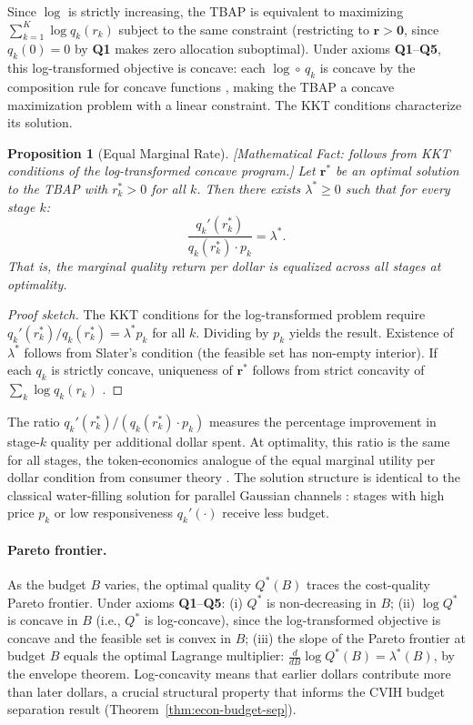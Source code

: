 \documentclass[11pt, a4paper]{googledeepmind}
\newtheorem{proposition}{Proposition}[section]
\begin{document}
Since $\log$ is strictly increasing, the TBAP is equivalent to maximizing $\sum_{k=1}^K \log q_k(r_k)$ subject to the same constraint (restricting to $\mathbf{r} > \mathbf{0}$, since $q_k(0) = 0$ by \textbf{Q1} makes zero allocation suboptimal). Under axioms \textbf{Q1}--\textbf{Q5}, this log-transformed objective is concave: each $\log \circ\, q_k$ is concave by the composition rule for concave functions \citep{boyd2004}, making the TBAP a concave maximization problem with a linear constraint. The KKT conditions characterize its solution.

\begin{proposition}[Equal Marginal Rate]
\label{thm:econ-emr}
\emph{[Mathematical Fact: follows from KKT conditions of the log-transformed concave program.]}
Let $\mathbf{r}^*$ be an optimal solution to the TBAP with $r_k^* > 0$ for all $k$. Then there exists $\lambda^* \geq 0$ such that for every stage $k$:
\begin{equation}\label{eq:econ-emr}
    \frac{q_k'(r_k^*)}{q_k(r_k^*) \cdot p_k} = \lambda^*.
\end{equation}
That is, the \emph{marginal quality return per dollar} is equalized across all stages at optimality.
\end{proposition}

\begin{proof}[Proof sketch]
The KKT conditions for the log-transformed problem require $q_k'(r_k^*) / q_k(r_k^*) = \lambda^* p_k$ for all $k$. Dividing by $p_k$ yields the result. Existence of $\lambda^*$ follows from Slater's condition (the feasible set has non-empty interior). If each $q_k$ is strictly concave, uniqueness of $\mathbf{r}^*$ follows from strict concavity of $\sum_k \log q_k(r_k)$ \citep{rockafellar1970}.
\end{proof}

The ratio $q_k'(r_k^*) / (q_k(r_k^*) \cdot p_k)$ measures the percentage improvement in stage-$k$ quality per additional dollar spent. At optimality, this ratio is the same for all stages, the token-economics analogue of the equal marginal utility per dollar condition from consumer theory \citep{mas-colell1995}. The solution structure is identical to the classical water-filling solution for parallel Gaussian channels \citep{cover2006}: stages with high price $p_k$ or low responsiveness $q_k'(\cdot)$ receive less budget.

\paragraph{Pareto frontier.} As the budget $B$ varies, the optimal quality $Q^*(B)$ traces the cost-quality Pareto frontier. Under axioms \textbf{Q1}--\textbf{Q5}: (i) $Q^*$ is non-decreasing in $B$; (ii) $\log Q^*$ is concave in $B$ (i.e., $Q^*$ is log-concave), since the log-transformed objective is concave and the feasible set is convex in $B$; (iii) the slope of the Pareto frontier at budget $B$ equals the optimal Lagrange multiplier: $\frac{d}{dB}\log Q^*(B) = \lambda^*(B)$, by the envelope theorem. Log-concavity means that earlier dollars contribute more than later dollars, a crucial structural property that informs the CVIH budget separation result (Theorem~\ref{thm:econ-budget-sep}).
\end{document}
